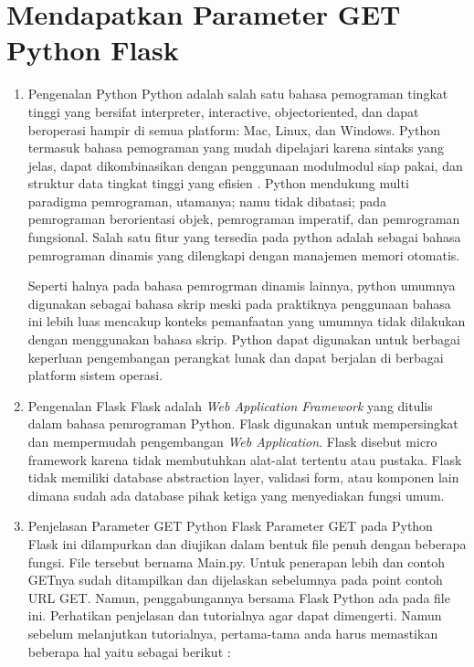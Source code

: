 \section {Mendapatkan Parameter GET Python Flask}
    \begin{enumerate}
        \item Pengenalan Python
        Python adalah salah satu bahasa pemograman tingkat tinggi yang bersifat interpreter, interactive, objectoriented, dan dapat beroperasi hampir di semua platform: Mac, Linux, dan Windows. Python termasuk bahasa pemograman yang mudah dipelajari karena sintaks yang jelas, dapat dikombinasikan dengan penggunaan modulmodul siap pakai, dan struktur data tingkat tinggi yang efisien \cite{kadir2005dasar}. Python mendukung multi paradigma pemrograman, utamanya; namu tidak dibatasi; pada pemrograman berorientasi objek, pemrograman imperatif, dan pemrograman fungsional. Salah satu fitur yang tersedia pada python adalah sebagai bahasa pemrograman dinamis yang dilengkapi dengan manajemen memori otomatis.

        Seperti halnya pada bahasa pemrogrman dinamis lainnya, python umumnya digunakan sebagai bahasa skrip meski pada praktiknya penggunaan bahasa ini lebih luas mencakup konteks pemanfaatan yang umumnya tidak dilakukan dengan menggunakan bahasa skrip. Python dapat digunakan untuk berbagai keperluan pengembangan perangkat lunak dan dapat berjalan di berbagai platform sistem operasi.

        \item Pengenalan Flask
         Flask adalah \textit{Web Application Framework} yang ditulis dalam bahasa pemrograman Python. Flask digunakan untuk mempersingkat dan mempermudah pengembangan \textit{Web Application}\cite{lokhande2015efficient}. Flask disebut micro framework karena tidak membutuhkan alat-alat tertentu atau pustaka. Flask tidak memiliki database abstraction layer, validasi form, atau komponen lain dimana sudah ada database pihak ketiga yang menyediakan fungsi umum.

        \item Penjelasan Parameter GET Python Flask
        Parameter GET pada Python Flask ini dilampurkan dan diujikan dalam bentuk file penuh dengan beberapa fungsi. File tersebut bernama Main.py. Untuk penerapan lebih dan contoh GETnya sudah ditampilkan dan dijelaskan sebelumnya pada point contoh URL GET. Namun, penggabungannya bersama Flask Python ada pada file ini. Perhatikan penjelasan dan tutorialnya agar dapat dimengerti. Namun sebelum melanjutkan tutorialnya, pertama-tama anda harus memastikan beberapa hal yaitu sebagai berikut :
    \end{enumerate}

